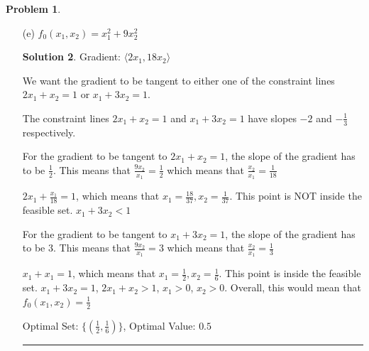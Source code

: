 \documentclass{article}
\theoremstyle{definition}
\newtheorem{problem}{Problem}
\def\fline{\rule{0.75\linewidth}{0.5pt}}
\newcommand{\finishline}{\begin{center}\fline\end{center}}
\newtheorem*{solution*}{Solution}
\newenvironment{solution}{\begin{solution*}}{{\finishline} \end{solution*}}
\begin{document}
\begin{problem}
\begin{itemize}
\begin{solution}
    The level curve of the objective function, $f_0(x_1, x_2) = \frac{1}{3}$, is tangent to the constraint line $2x_1 + x_2 = 1$ at $(\frac{1}{3}, \frac{1}{3})$ which yields an objective function value of $\frac{1}{3}$. This point is inside the feasible set. $2x_1 + x_2 = 1$, $x_1 + 3x_2 > 1$, $x_1 > 0$, $x_2 > 0$ \newline
    
        Optimal Set: $\{(\frac{1}{3}, \frac{1}{3})\}$, Optimal Value: $\frac{1}{3}$
    \end{solution}
    \item[(e)] $f_0(x_1, x_2) = x_1^2 + 9x_2^2$
    \begin{solution}
    Gradient: $\langle 2x_1, 18x_2 \rangle$ \newline 

    We want the gradient to be tangent to either one of the constraint lines $2x_1 + x_2 = 1$ or $x_1 + 3x_2 = 1$. \newline 

    The constraint lines $2x_1 + x_2 = 1$ and $x_1 + 3x_2 = 1$ have slopes $-2$ and $-\frac{1}{3}$ respectively. \newline 

For the gradient to be tangent to $2x_1 + x_2 = 1$, the slope of the gradient has to be $\frac{1}{2}$. This means that $\frac{9x_2}{x_1} = \frac{1}{2}$ which means that $\frac{x_2}{x_1} = \frac{1}{18}$ \newline 


$2x_1 + \frac{x_1}{18} = 1$, which means that $x_1 = \frac{18}{37}, x_2 = \frac{1}{37}$. This point is NOT inside the feasible set. $x_1 + 3x_2 < 1$ \newline 

For the gradient to be tangent to $x_1 + 3x_2 = 1$, the slope of the gradient has to be $3$. This means that $\frac{9x_2}{x_1} = 3$ which means that $\frac{x_2}{x_1} = \frac{1}{3}$ \newline 


$x_1 + x_1 = 1$, which means that $x_1 = \frac{1}{2}, x_2 = \frac{1}{6}$. This point is inside the feasible set. $x_1 + 3x_2 = 1$, $2x_1 + x_2 > 1$, $x_1 > 0$, $x_2 > 0$.  Overall, this would mean that $f_0(x_1, x_2) = \frac{1}{2}$ \newline 
    
        Optimal Set: $\{(\frac{1}{2}, \frac{1}{6})\}$, Optimal Value: $0.5$
    \end{solution}
\end{itemize}
\end{problem}
\end{document}
